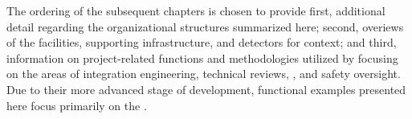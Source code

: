 The ordering of the subsequent chapters is chosen to provide first,  
additional detail regarding the organizational structures summarized 
here; second, overiews of the facilities, supporting infrastructure, 
and detectors for context; and third, information on project-related 
functions and methodologies utilized by   
focusing on the areas of integration engineering, technical reviews, 
, and safety oversight.  Due to their more advanced stage 
of development, functional examples presented here focus primarily on 
the  .
